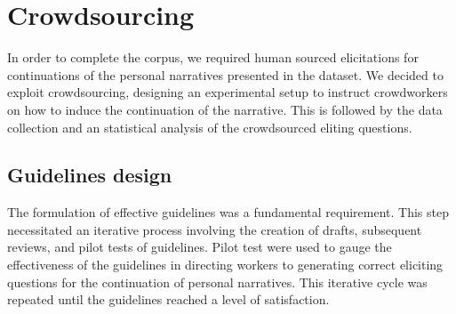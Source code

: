 
\section{Crowdsourcing}
In order to complete the corpus, we required human sourced elicitations for continuations of the personal narratives presented in the dataset. We decided to exploit crowdsourcing, designing an experimental setup to instruct crowdworkers on how to induce the continuation of the narrative. This is followed by the data collection and an statistical analysis of the crowdsourced eliting questions.
\subsection{Guidelines design}
The formulation of effective guidelines was a fundamental requirement. This step necessitated an iterative process involving the creation of drafts, subsequent reviews, and pilot tests of guidelines. Pilot test were used to gauge the effectiveness of the guidelines in directing workers to generating correct eliciting questions for the continuation of personal narratives. This iterative cycle was repeated until the guidelines reached a level of satisfaction.

